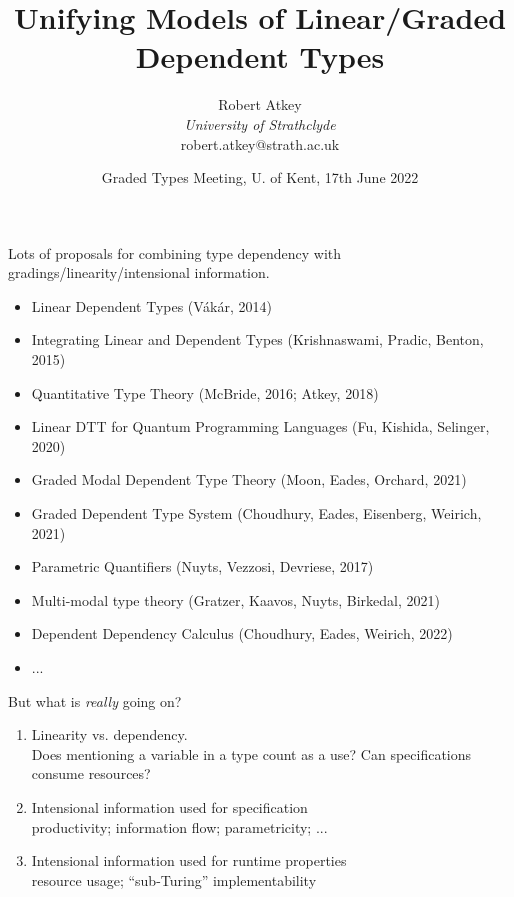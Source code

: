 \documentclass[xetex,serif,mathserif,aspectratio=169]{beamer}
\title{Unifying Models of Linear/Graded Dependent Types}
\author{Robert Atkey \\
  \emph{University of Strathclyde} \\
  robert.atkey@strath.ac.uk}
\date{Graded Types Meeting, U. of Kent, 17th June 2022}
\newcommand{\citationgrey}[1]{\textcolor{black!60}{#1}}
\newcommand{\titlecard}[1]{\begin{frame}%
  \begin{center}%
    \Large \textcolor{titlered}{#1}%
  \end{center}%
\end{frame}}
\begin{document}
\frame{\titlepage}

\begin{frame}
  Lots of proposals for combining type dependency with
  gradings/linearity/intensional information.

  \bigskip

  \begin{itemize}
  \item Linear Dependent Types \citationgrey{(V{\'a}k{\'a}r, 2014)}
  \item Integrating Linear and Dependent Types \citationgrey{(Krishnaswami, Pradic, Benton, 2015)}
  \item Quantitative Type Theory \citationgrey{(McBride, 2016; Atkey, 2018)}
  \item Linear DTT for Quantum Programming Languages \citationgrey{(Fu, Kishida, Selinger, 2020)}
  \item Graded Modal Dependent Type Theory \citationgrey{(Moon, Eades, Orchard, 2021)}
  \item Graded Dependent Type System \citationgrey{(Choudhury, Eades, Eisenberg, Weirich, 2021)}
  \item Parametric Quantifiers \citationgrey{(Nuyts, Vezzosi, Devriese, 2017)}
  \item Multi-modal type theory \citationgrey{(Gratzer, Kaavos, Nuyts, Birkedal, 2021)}
  \item Dependent Dependency Calculus \citationgrey{(Choudhury, Eades, Weirich, 2022)}
  \item ...
  \end{itemize}
\end{frame}

\titlecard{But what is \emph{really} going on?}

\begin{frame}

  \begin{enumerate}
  \item<1-> Linearity vs. dependency. \\
    {\small Does mentioning a variable in a type count as a use? Can
      specifications consume resources?}

    \bigskip
  \item<2-> Intensional information used for specification \\
    {\small productivity; information flow; parametricity; ...}

    \bigskip
  \item<3-> Intensional information used for runtime properties \\
    {\small resource usage; “sub-Turing” implementability}
  \end{enumerate}

\end{frame}
\end{document}
